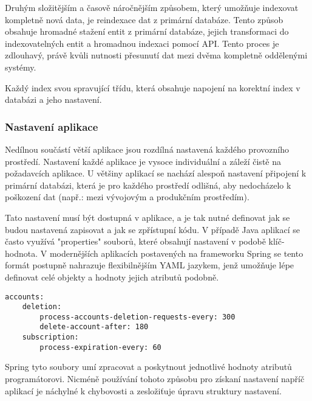 
		Druhým složitějším a časově náročnějším způsobem, který umožňuje indexovat kompletně nová data, je
		reindexace dat z primární databáze.
		Tento způsob obsahuje hromadné stažení entit z primární databáze, jejich transformaci do indexovatelných entit
		a hromadnou indexaci pomocí \ac{API}.
		Tento proces je zdlouhavý, právě kvůli nutnosti přesunutí dat mezi dvěma kompletně oddělenými systémy.


		Každý index svou spravující třídu, která obsahuje napojení na korektní index v databázi a jeho nastavení.

		\subsubsection{Nastavení aplikace}

		Nedílnou součástí větší aplikace jsou rozdílná nastavená každého provozního prostředí.
		Nastavení každé aplikace je vysoce individuální a záleží čistě na požadavcích aplikace.
		U většiny aplikací se nachází alespoň nastavení připojení k primární databázi, která je pro každého prostředí
		odlišná, aby nedocházelo k poškození dat (např.: mezi vývojovým a produkčním prostředím).

		Tato nastavení musí být dostupná v aplikace, a je tak nutné definovat jak se budou nastavená zapisovat a jak se
		zpřístupní kódu.
		V případě Java aplikací se často využívá "properties" souborů, které obsahují nastavení v podobě klíč-hodnota.
		V modernějších aplikacích postavených na frameworku Spring se tento formát postupně nahrazuje flexibilnějším
		\ac{YAML} jazykem, jenž umožňuje lépe definovat celé objekty a hodnoty jejich atributů podobně.

		\begin{lstlisting}[caption={Ukázka části nastavení aplikace v YAML konfiguračním souboru. Zdroj: [autor]}]
accounts:
	deletion:
		process-accounts-deletion-requests-every: 300
		delete-account-after: 180
	subscription:
		process-expiration-every: 60
		\end{lstlisting}

		Spring tyto soubory umí zpracovat a poskytnout jednotlivé hodnoty atributů programátorovi.
		Nicméně používání tohoto způsobu pro získaní nastavení napříč aplikací je náchylné k chybovosti a
		zesložiťuje úpravu struktury nastavení.

